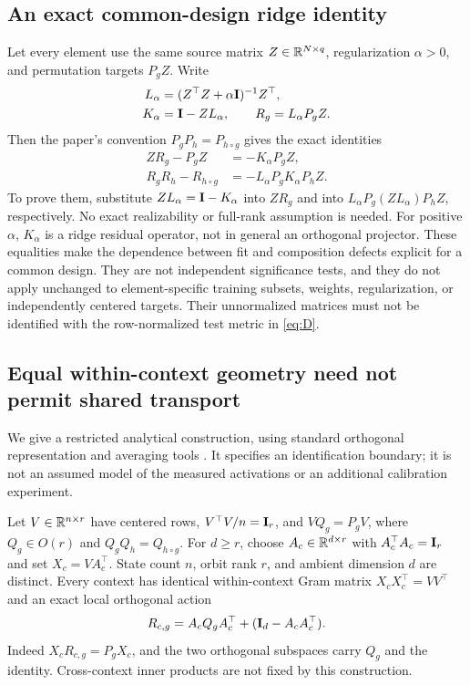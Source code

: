\subsection{An exact common-design ridge identity}
\label{app:ridge-identity}
Let every element use the same source matrix $Z\in\mathbb{R}^{N\times q}$, regularization $\alpha>0$, and permutation targets $P_gZ$. Write
\begin{align*}
 L_\alpha&=(Z^\top Z+\alpha\mathbf{I})^{-1}Z^\top,\\
 K_\alpha&=\mathbf{I}-ZL_\alpha,\qquad R_g=L_\alpha P_gZ.
\end{align*}
Then the paper's convention $P_gP_h=P_{h\circ g}$ gives the exact identities
\begin{align}
 ZR_g-P_gZ&=-K_\alpha P_gZ,\label{eq:ridge-fit-identity}\\
 R_gR_h-R_{h\circ g}&=-L_\alpha P_gK_\alpha P_hZ.
 \label{eq:ridge-law-identity}
\end{align}
To prove them, substitute $ZL_\alpha=\mathbf{I}-K_\alpha$ into $ZR_g$ and into $L_\alpha P_g(ZL_\alpha)P_hZ$, respectively. No exact realizability or full-rank assumption is needed. For positive $\alpha$, $K_\alpha$ is a ridge residual operator, not in general an orthogonal projector. These equalities make the dependence between fit and composition defects explicit for a common design. They are not independent significance tests, and they do not apply unchanged to element-specific training subsets, weights, regularization, or independently centered targets. Their unnormalized matrices must not be identified with the row-normalized test metric in \cref{eq:D}.

\subsection{Equal within-context geometry need not permit shared transport}
\label{app:orientation}
We give a restricted analytical construction, using standard orthogonal representation and averaging tools \citep{serre1977linear}. It specifies an identification boundary; it is not an assumed model of the measured activations or an additional calibration experiment.

Let $V\in\mathbb{R}^{n\times r}$ have centered rows, $V^\top V/n=\mathbf{I}_r$, and $VQ_g=P_gV$, where $Q_g\in O(r)$ and $Q_gQ_h=Q_{h\circ g}$. For $d\geq r$, choose $A_c\in\mathbb{R}^{d\times r}$ with $A_c^\top A_c=\mathbf{I}_r$ and set $X_c=VA_c^\top$. State count $n$, orbit rank $r$, and ambient dimension $d$ are distinct. Every context has identical within-context Gram matrix $X_cX_c^\top=VV^\top$ and an exact local orthogonal action
\[
 R_{c,g}=A_cQ_gA_c^\top+(\mathbf{I}_d-A_cA_c^\top).
\]
Indeed $X_cR_{c,g}=P_gX_c$, and the two orthogonal subspaces carry $Q_g$ and the identity. Cross-context inner products are not fixed by this construction.

